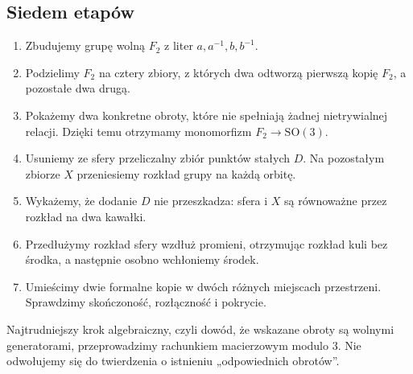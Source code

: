 \subsection{Siedem etapów}
\begin{enumerate}
\item Zbudujemy grupę wolną $F_2$ z liter $a,a^{-1},b,b^{-1}$.
\item Podzielimy $F_2$ na cztery zbiory, z których dwa odtworzą pierwszą kopię $F_2$, a pozostałe dwa drugą.
\item Pokażemy dwa konkretne obroty, które nie spełniają żadnej nietrywialnej relacji. Dzięki temu otrzymamy monomorfizm $F_2\to\mathrm{SO}(3)$.
\item Usuniemy ze sfery przeliczalny zbiór punktów stałych $D$. Na pozostałym zbiorze $X$ przeniesiemy rozkład grupy na każdą orbitę.
\item Wykażemy, że dodanie $D$ nie przeszkadza: sfera i $X$ są równoważne przez rozkład na dwa kawałki.
\item Przedłużymy rozkład sfery wzdłuż promieni, otrzymując rozkład kuli bez środka, a następnie osobno wchłoniemy środek.
\item Umieścimy dwie formalne kopie w dwóch różnych miejscach przestrzeni. Sprawdzimy skończoność, rozłączność i pokrycie.
\end{enumerate}
Najtrudniejszy krok algebraiczny, czyli dowód, że wskazane obroty są wolnymi generatorami, przeprowadzimy rachunkiem macierzowym modulo $3$. Nie odwołujemy się do twierdzenia o istnieniu „odpowiednich obrotów”.

